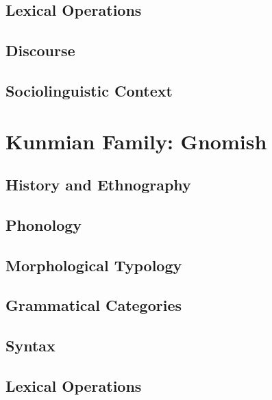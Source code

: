 \documentclass[12pt,letterpaper,openany,twoside]{memoir}
\let\originalpart=\part
\def\part{\cleardoublepage\originalpart}
\begin{document}
\chapter{Lexical Operations}

\chapter{Discourse}

\chapter{Sociolinguistic Context}

\part{Kunmian Family: Gnomish}

\chapter{History and Ethnography}

\chapter{Phonology}

\chapter{Morphological Typology}

\chapter{Grammatical Categories}

\chapter{Syntax}

\chapter{Lexical Operations}
\end{document}
